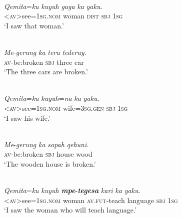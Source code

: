 \documentclass[output=paper
,modfonts
,nonflat]{langsci/langscibook}
\begin{document}
\begin{exe}
	\label{e:tsukida:29}\\
	\gll \textit{Q}{\USSmaller}\textit{em}{\USGreater}\textit{ita}=\textit{ku}  \textit{kuyuh} \textit{gaga} \textit{ka} \textit{yaku}.\\
	<\textsc{av}>see=\textsc{1sg.nom} woman \textsc{dist} \textsc{sbj} \textsc{1sg}\\
	\glt ‘I saw that woman.’
\end{exe}

\begin{exe}
	\label{e:tsukida:30}\\
	\gll \textit{Me}-\textit{gerung} \textit{ka}  \textit{teru} \textit{tederuy}.\\
	\textsc{av}-be:broken \textsc{sbj} three car\\
	\glt ‘The three cars are broken.’
\end{exe}

\begin{exe}
	\label{e:tsukida:31}\\
	\gll \textit{Q}{\USSmaller}\textit{em}{\USGreater}\textit{ita}=\textit{ku} \textit{kuyuh}=\textit{na} \textit{ka} \textit{yaku}.\\
	<\textsc{av}>see=\textsc{1sg.nom} wife=\textsc{3sg}.\textsc{gen} \textsc{sbj} \textsc{1sg}\\
	\glt ‘I saw his wife.’
\end{exe}

\begin{exe}
	\label{e:tsukida:32}\\
	\gll \textit{Me}-\textit{gerung} \textit{ka}  \textit{sapah}   \textit{qehuni}.\\
	\textsc{av}-be:broken \textsc{sbj} house  wood\\
	\glt ‘The wooden house is broken.’
\end{exe}

\begin{exe}
	\label{e:tsukida:33}\\
	\gll \textit{Q}{\USSmaller}\textit{em}{\USGreater}\textit{ita}=\textit{ku} \textit{kuyuh} \textbf{\textit{mpe}}-\textbf{\textit{tegesa}} \textit{kari} \textit{ka}  \textit{yaku}.\\
	<\textsc{av}>see=\textsc{1sg.nom} woman \textsc{av}.\textsc{fut}-teach  language \textsc{sbj} \textsc{1sg}\\
	\glt ‘I saw the woman who will teach language.’
\end{exe}
\end{document}
